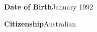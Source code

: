 

\begin{small} \color{black}
\textbf{Date of Birth}\phantom{Citizenship}January 1992

\textbf{Citizenship}\phantom{Date of Birth}Australian
\end{small}

